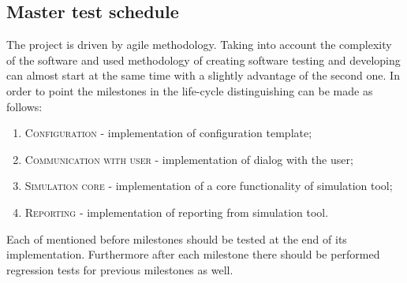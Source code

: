 \subsection{Master test schedule} \label{s:introduction:master-test-schedule}
	\begin{comment}
		$<$Describe the test activities within the project life cycle and milestones. Summarize the overall schedule of the testing tasks, identifying where task results feed back to the development, organizational, and supporting processes (e.g., quality assurance and configuration management). Describe the task iteration policy for the re-execution of test tasks and any dependencies. $>$
	\end{comment}
	The project is driven by agile methodology. Taking into account the complexity of the software and used methodology of creating software testing and developing can almost start at the same time with a slightly advantage of the second one. In order to point the milestones in the life-cycle distinguishing can be made as follows:
	\begin{enumerate}
		\item \textsc{Configuration} - implementation of configuration template;
		\item \textsc{Communication with user} - implementation of dialog with the user;
		\item \textsc{Simulation core} - implementation of a core functionality of simulation tool;
		\item \textsc{Reporting} - implementation of reporting from simulation tool.
	\end{enumerate}
	Each of mentioned before milestones should be tested at the end of its implementation. Furthermore after each milestone there should be performed regression tests for previous milestones as well. 
